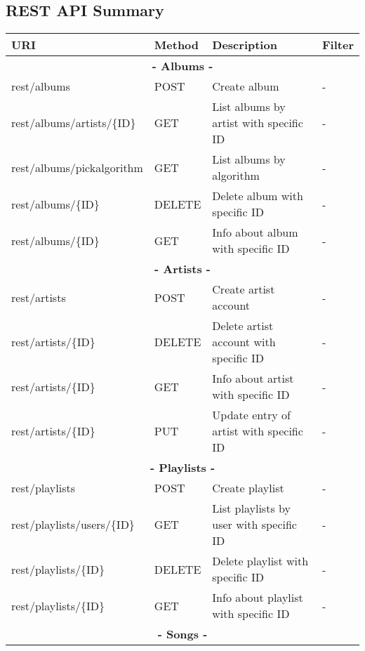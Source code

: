 \subsection{REST API Summary}


\begin{longtable}{|p{}|p{}|p{}|p{}|} 
\hline
\textbf{URI} & \textbf{Method} & \textbf{Description} & \textbf{Filter} \\\hline\hline
        \multicolumn{4}{|c|}{\textbf{- Albums -}} \\\hline
        rest/albums & POST & Create album & - \\\hline
        rest/albums/artists/\{ID\} & GET & List albums by artist with specific ID & - \\\hline
        rest/albums/pickalgorithm & GET & List albums by algorithm & - \\\hline
        rest/albums/\{ID\} & DELETE & Delete album with specific ID & - \\\hline
        rest/albums/\{ID\} & GET & Info about album with specific ID & - \\\hline
        \multicolumn{4}{|c|}{\textbf{- Artists -}} \\\hline
        rest/artists & POST & Create artist account & - \\\hline
        rest/artists/\{ID\} & DELETE & Delete artist account with specific ID & - \\\hline
        rest/artists/\{ID\} & GET & Info about artist with specific ID & - \\\hline
        rest/artists/\{ID\} & PUT & Update entry of artist with specific ID & - \\\hline
        \multicolumn{4}{|c|}{\textbf{- Playlists -}} \\\hline
        rest/playlists & POST & Create playlist & - \\\hline
        rest/playlists/users/\{ID\} & GET & List playlists by user with specific ID & - \\\hline
        rest/playlists/\{ID\} & DELETE & Delete playlist with specific ID & - \\\hline
        rest/playlists/\{ID\} & GET & Info about playlist with specific ID & - \\\hline
        \multicolumn{4}{|c|}{\textbf{- Songs -}} \\\hline

\end{longtable}
